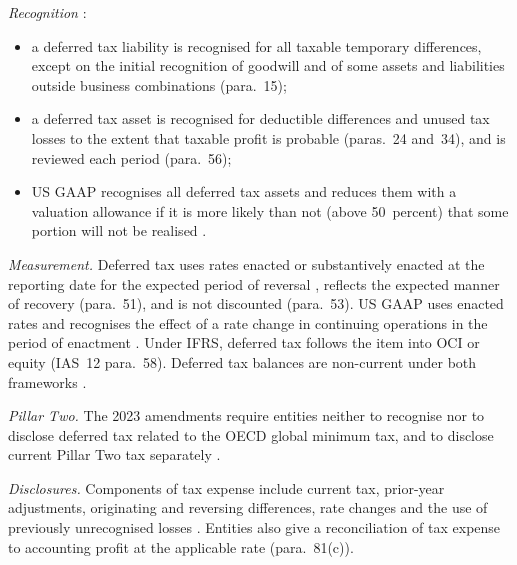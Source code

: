 \begin{qfmethod}\label{meth:deferred-tax-analysis}
 \emph{Recognition} \citep[IAS~12]{eu-2023-1803-ias12}:
\begin{itemize}
\item a deferred tax liability is recognised for all taxable temporary differences, except on the initial recognition of goodwill and of some assets and liabilities outside business combinations (para.~15);
\item a deferred tax asset is recognised for deductible differences and unused tax losses to the extent that taxable profit is probable (paras.~24 and~34), and is reviewed each period (para.~56);
\item US GAAP recognises all deferred tax assets and reduces them with a valuation allowance if it is more likely than not (above 50~percent) that some portion will not be realised \citep[para.~17]{us-income-taxes-1992}.
\end{itemize}

\emph{Measurement.} Deferred tax uses rates enacted or substantively enacted at the reporting date for the expected period of reversal \citep[IAS~12 para.~47]{eu-2023-1803-ias12}, reflects the expected manner of recovery (para.~51), and is not discounted (para.~53). US GAAP uses enacted rates and recognises the effect of a rate change in continuing operations in the period of enactment \citep[paras.~18 and~27]{us-income-taxes-1992}. Under IFRS, deferred tax follows the item into OCI or equity (IAS~12 para.~58). Deferred tax balances are non-current under both frameworks \citep[p.~1]{us-deferred-tax-classification-2015}.

\emph{Pillar Two.} The 2023 amendments require entities neither to recognise nor to disclose deferred tax related to the OECD global minimum tax, and to disclose current Pillar Two tax separately \citep[Annex, IAS~12 paras.~4A and~88A--88B]{eu-2023-2468-ias12}.

\emph{Disclosures.} Components of tax expense include current tax, prior-year adjustments, originating and reversing differences, rate changes and the use of previously unrecognised losses \citep[IAS~12 paras.~79--80]{eu-2023-1803-ias12}. Entities also give a reconciliation of tax expense to accounting profit at the applicable rate (para.~81(c)).


\end{qfmethod}
